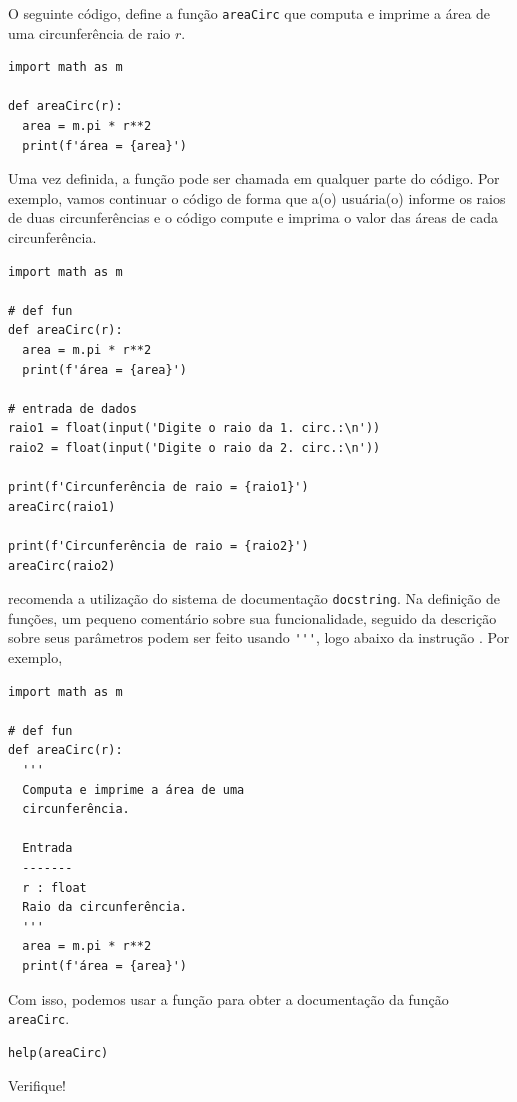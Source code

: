 \begin{ex}\label{cap_fun_sec_def:ex:areaCirc}
  O seguinte código, define a função \lstinline+areaCirc+ que computa e imprime a área de uma circunferência de raio $r$.

\begin{lstlisting}
import math as m

def areaCirc(r):
  area = m.pi * r**2
  print(f'área = {area}')
\end{lstlisting}

Uma vez definida, a função pode ser chamada em qualquer parte do código. Por exemplo, vamos continuar o código de forma que a(o) usuária(o) informe os raios de duas circunferências e o código compute e imprima o valor das áreas de cada circunferência.

\begin{lstlisting}
import math as m

# def fun
def areaCirc(r):
  area = m.pi * r**2
  print(f'área = {area}')
    
# entrada de dados
raio1 = float(input('Digite o raio da 1. circ.:\n'))
raio2 = float(input('Digite o raio da 2. circ.:\n'))

print(f'Circunferência de raio = {raio1}')
areaCirc(raio1)

print(f'Circunferência de raio = {raio2}')
areaCirc(raio2)
\end{lstlisting}

\end{ex}

\begin{obs}
  {\python} recomenda a utilização do sistema de documentação \lstinline+docstring+. Na definição de funções, um pequeno comentário sobre sua funcionalidade, seguido da descrição sobre seus parâmetros podem ser feito usando \lstinline+'''+, logo abaixo da instrução {\PYTHONdef}. Por exemplo,

\begin{lstlisting}
import math as m

# def fun
def areaCirc(r):
  '''
  Computa e imprime a área de uma
  circunferência.

  Entrada
  -------
  r : float
  Raio da circunferência.
  '''
  area = m.pi * r**2
  print(f'área = {area}')
\end{lstlisting}

Com isso, podemos usar a função {\PYTHONhelp} para obter a documentação da função \lstinline+areaCirc+.

\begin{lstlisting}
help(areaCirc)
\end{lstlisting}

Verifique!
\end{obs}

